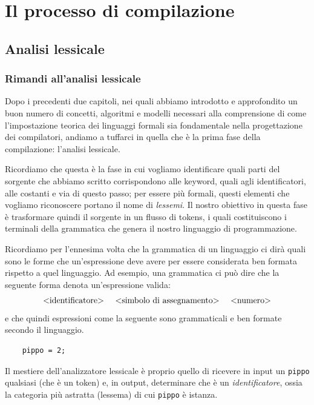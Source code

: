 \documentclass[class=book, crop=false, oneside, 12pt]{standalone}
\begin{document}
\part{Il processo di compilazione}
\chapter{Analisi lessicale}

\section{Rimandi all'analisi lessicale}
Dopo i precedenti due capitoli, nei quali abbiamo introdotto e approfondito un buon numero di concetti, algoritmi e modelli necessari alla comprensione di come l'impostazione teorica dei linguaggi formali sia fondamentale nella progettazione dei compilatori, andiamo a tuffarci in quella che è la prima fase della compilazione: l'analisi lessicale.


Ricordiamo che questa è la fase in cui vogliamo identificare quali parti del sorgente che abbiamo scritto corrispondono alle keyword, quali agli identificatori, alle costanti e via di questo passo; per essere più formali, questi elementi che vogliamo riconoscere portano il nome di \emph{lessemi}. 
Il nostro obiettivo in questa fase è trasformare quindi il sorgente in un flusso di tokens, i quali costituiscono i terminali della grammatica che genera il nostro linguaggio di programmazione.

Ricordiamo per l'ennesima volta che la grammatica di un linguaggio ci dirà quali sono le forme che un'espressione deve avere per essere considerata ben formata rispetto a quel linguaggio. Ad esempio, una grammatica ci può dire che la seguente forma denota un'espressione valida:
\begin{equation*}
    \textrm{<identificatore> \quad <simbolo di assegnamento> \quad <numero>}
\end{equation*}
e che quindi espressioni come la seguente sono grammaticali e ben formate secondo il linguaggio.\\
\begin{verbatim}
    pippo = 2;
\end{verbatim}
Il mestiere dell'analizzatore lessicale è proprio quello di ricevere in input un \texttt{pippo} qualsiasi (che è un token) e, in output, determinare che è un \emph{identificatore}, ossia la categoria più astratta (lessema) di cui \texttt{pippo} è istanza.
\end{document}
